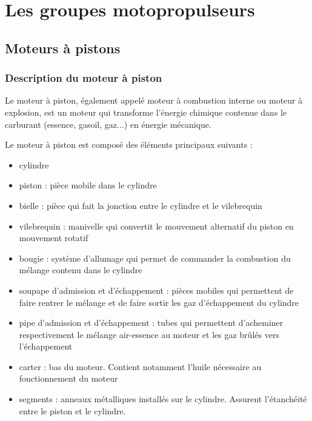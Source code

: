 

\section{Les groupes motopropulseurs}

	\subsection{Moteurs à pistons}
		\subsubsection{Description du moteur à piston}
		Le moteur à piston, également appelé moteur à combustion interne ou moteur à explosion, est un moteur qui transforme l'énergie chimique contenue dans le carburant (essence, gasoil, gaz...) en énergie mécanique.
		\begin{figure}[H]
  		\centering
    		
		\end{figure}
		
		Le moteur à piston est composé des éléments principaux suivants :
		\begin{itemize}
			\item cylindre
			\item piston : pièce mobile dans le cylindre
			\item bielle : pièce qui fait la jonction entre le cylindre et le vilebrequin
			\item vilebrequin : manivelle qui convertit le mouvement alternatif du piston en mouvement rotatif
			\item bougie : système d'allumage qui permet de commander la combustion du mélange contenu dans le cylindre
			\item soupape d'admission et d'échappement : pièces mobiles qui permettent de faire rentrer le mélange et de faire sortir les gaz d'échappement du cylindre 
			\item pipe d'admission et d'échappement : tubes qui permettent d'acheminer respectivement le mélange air-essence au moteur et les gaz brûlés vers l'échappement
			\item carter : bas du moteur. Contient notamment l'huile nécessaire au fonctionnement du moteur
			\item segments : anneaux métalliques installés sur le cylindre. Assurent l'étanchéité entre le piston et le cylindre.
		\end{itemize}
	
